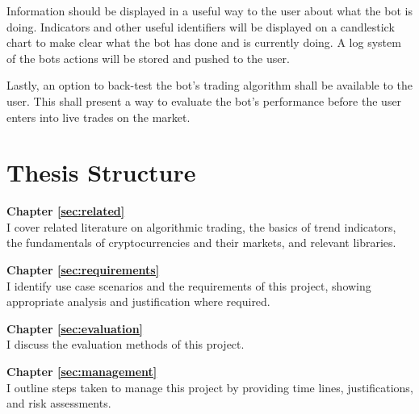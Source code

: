 Information should be displayed in a useful way to the user about what the bot is doing. Indicators and other useful identifiers will be displayed on a candlestick chart to make clear what the bot has done and is currently doing. A log system of the bots actions will be stored and pushed to the user.

Lastly, an option to back-test the bot's trading algorithm shall be available to the user. This shall present a way to evaluate the bot's performance before the user enters into live trades on the market. 



\section{Thesis Structure}
\label{sec:intro:structure}

\noindent\textbf{Chapter \ref{sec:related}} \\[0.2em]
I cover related literature on algorithmic trading, the basics of trend indicators, the fundamentals of cryptocurrencies and their markets, and relevant libraries.

\noindent\textbf{Chapter \ref{sec:requirements}} \\[0.2em]
I identify use case scenarios and the requirements of this project, showing appropriate analysis and justification where required.


\noindent\textbf{Chapter \ref{sec:evaluation}} \\[0.2em]
I discuss the evaluation methods of this project.

\noindent\textbf{Chapter \ref{sec:management}} \\[0.2em]
I outline steps taken to manage this project by providing time lines, justifications, and risk assessments.